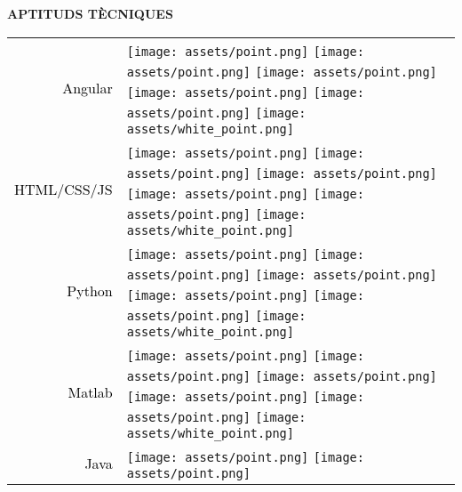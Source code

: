 \documentclass[../main.tex]{subfiles}
\begin{document}
\vspace*{0.5cm}

\textbf{\textcolor{myCV2}{APTITUDS TÈCNIQUES\underline{\hspace{3.5cm}}}}
\vspace*{0.2cm}

    \begin{tabular}{r l}
    \textcolor{black}{\vspace*{0.1cm}Angular} &            
            \texttt{[image: assets/point.png]}
            \texttt{[image: assets/point.png]}
            \texttt{[image: assets/point.png]}
            \texttt{[image: assets/point.png]}
            \texttt{[image: assets/point.png]}
            \texttt{[image: assets/white\_point.png]}\\
    \textcolor{black}{\vspace*{0.1cm}HTML/CSS/JS} &
            \texttt{[image: assets/point.png]}
            \texttt{[image: assets/point.png]}
            \texttt{[image: assets/point.png]}
            \texttt{[image: assets/point.png]}
            \texttt{[image: assets/point.png]}
            \texttt{[image: assets/white\_point.png]}\\
    \textcolor{black}{\vspace*{0.1cm}Python} &
            \texttt{[image: assets/point.png]}
            \texttt{[image: assets/point.png]}
            \texttt{[image: assets/point.png]}
            \texttt{[image: assets/point.png]}
            \texttt{[image: assets/point.png]}
            \texttt{[image: assets/white\_point.png]}\\
    \textcolor{black}{\vspace*{0.1cm}Matlab} &
            \texttt{[image: assets/point.png]}
            \texttt{[image: assets/point.png]}
            \texttt{[image: assets/point.png]}
            \texttt{[image: assets/point.png]}
            \texttt{[image: assets/point.png]}
            \texttt{[image: assets/white\_point.png]}\\
    \textcolor{black}{\vspace*{0.1cm}Java} &
            \texttt{[image: assets/point.png]}
            \texttt{[image: assets/point.png]}

\end{tabular}
\end{document}
